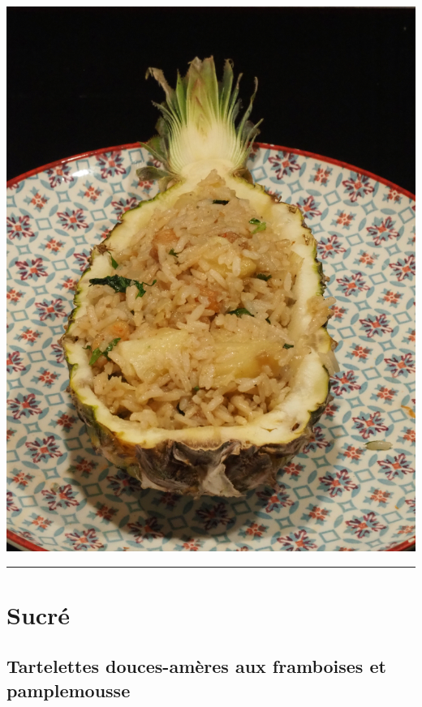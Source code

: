 \documentclass[]{book}
\begin{document}
\begin{center}\includegraphics[width=0.9\linewidth]{photos/riz_saute} \end{center}

\begin{center}\rule{0.5\linewidth}{0.5pt}\end{center}

\hypertarget{sucruxe9}{%
\section*{Sucré}\label{sucruxe9}}

\hypertarget{tartelettes-douces-amuxe8res-aux-framboises-et-pamplemousse}{%
\subsection*{\texorpdfstring{{Tartelettes douces-amères aux framboises et pamplemousse}}{Tartelettes douces-amères aux framboises et pamplemousse}}\label{tartelettes-douces-amuxe8res-aux-framboises-et-pamplemousse}}
\end{document}
